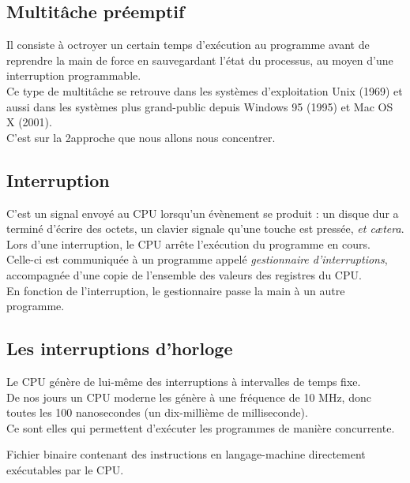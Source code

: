 \documentclass[10pt,firamath,cours]{nsi}
\begin{document}
\subsection{Multitâche préemptif}
Il consiste à octroyer un certain temps d'exécution au programme avant de reprendre la main de force en sauvegardant l'état du processus, au moyen d'une interruption programmable.\\
Ce type de multitâche se retrouve dans les systèmes d'exploitation Unix (1969) et aussi dans les systèmes plus grand-public depuis Windows 95 (1995) et Mac OS X (2001).\\

C'est sur la 2\eme approche que nous allons nous concentrer.

\subsection{Interruption}
C'est un signal envoyé au CPU lorsqu'un évènement se produit : un disque dur a terminé d'écrire des octets, un clavier signale qu'une touche est pressée, \textit{et c\ae tera}.\\

Lors d'une interruption, le CPU arrête l'exécution du programme en cours.\\
Celle-ci est communiquée à un programme appelé \textit{gestionnaire d'interruptions}, accompagnée d'une copie de l'ensemble des valeurs des registres du CPU.\\
En fonction de l'interruption, le gestionnaire passe la main à un autre programme.

    
\subsection{Les interruptions d'horloge}
Le CPU génère de lui-même des interruptions à intervalles de temps fixe.\\
De nos jours un CPU moderne les génère à une fréquence de 10 MHz, donc toutes les 100 nanosecondes (un dix-millième de milliseconde).\\

Ce sont elles qui permettent d'exécuter les programmes de manière concurrente.


\begin{definition}[ : exécutable]
    Fichier binaire contenant des instructions en langage-machine directement exécutables par le CPU.    
\end{definition}
    
\end{document}
